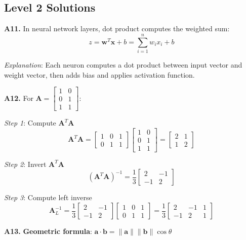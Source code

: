 \documentclass[12pt,a4paper]{article}
\theoremstyle{definition}
\begin{document}
\subsection{Level 2 Solutions}

\textbf{A11.} In neural network layers, dot product computes the weighted sum:
\[
z = \mathbf{w}^T\mathbf{x} + b = \sum_{i=1}^{n} w_i x_i + b
\]

\textit{Explanation}: Each neuron computes a dot product between input vector and weight vector, then adds bias and applies activation function.

\textbf{A12.} For $\mathbf{A} = \begin{bmatrix} 1 & 0 \\ 0 & 1 \\ 1 & 1 \end{bmatrix}$:

\textit{Step 1}: Compute $\mathbf{A}^T\mathbf{A}$
\[
\mathbf{A}^T\mathbf{A} = \begin{bmatrix} 1 & 0 & 1 \\ 0 & 1 & 1 \end{bmatrix} \begin{bmatrix} 1 & 0 \\ 0 & 1 \\ 1 & 1 \end{bmatrix} = \begin{bmatrix} 2 & 1 \\ 1 & 2 \end{bmatrix}
\]

\textit{Step 2}: Invert $\mathbf{A}^T\mathbf{A}$
\[
(\mathbf{A}^T\mathbf{A})^{-1} = \frac{1}{3}\begin{bmatrix} 2 & -1 \\ -1 & 2 \end{bmatrix}
\]

\textit{Step 3}: Compute left inverse
\[
\mathbf{A}_L^{-1} = \frac{1}{3}\begin{bmatrix} 2 & -1 \\ -1 & 2 \end{bmatrix} \begin{bmatrix} 1 & 0 & 1 \\ 0 & 1 & 1 \end{bmatrix} = \frac{1}{3}\begin{bmatrix} 2 & -1 & 1 \\ -1 & 2 & 1 \end{bmatrix}
\]

\textbf{A13.} \textbf{Geometric formula}: $\mathbf{a} \cdot \mathbf{b} = \|\mathbf{a}\| \|\mathbf{b}\| \cos \theta$
\end{document}
